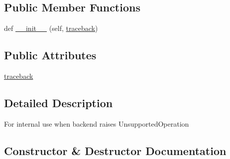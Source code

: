 \subsection*{Public Member Functions}
\begin{DoxyCompactItemize}
\item 
def \hyperlink{classpip_1_1__vendor_1_1pep517_1_1in__process_1_1__in__process_1_1GotUnsupportedOperation_a7b5417bc85069ca5fe786369fbcbd7f2}{\+\_\+\+\_\+init\+\_\+\+\_\+} (self, \hyperlink{classpip_1_1__vendor_1_1pep517_1_1in__process_1_1__in__process_1_1GotUnsupportedOperation_a119665accd5b351c927c957d2ebecf43}{traceback})
\end{DoxyCompactItemize}
\subsection*{Public Attributes}
\begin{DoxyCompactItemize}
\item 
\hyperlink{classpip_1_1__vendor_1_1pep517_1_1in__process_1_1__in__process_1_1GotUnsupportedOperation_a119665accd5b351c927c957d2ebecf43}{traceback}
\end{DoxyCompactItemize}


\subsection{Detailed Description}
\begin{DoxyVerb}For internal use when backend raises UnsupportedOperation\end{DoxyVerb}
 

\subsection{Constructor \& Destructor Documentation}
\mbox{\label{classpip_1_1__vendor_1_1pep517_1_1in__process_1_1__in__process_1_1GotUnsupportedOperation_a7b5417bc85069ca5fe786369fbcbd7f2}} 
